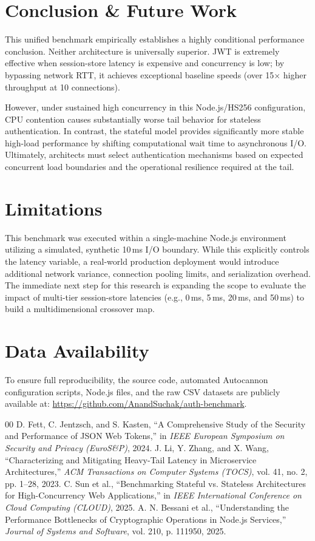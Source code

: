 \documentclass[conference]{IEEEtran}
\begin{document}
\section{Conclusion \& Future Work}
This unified benchmark empirically establishes a highly conditional performance conclusion. Neither architecture is universally superior. JWT is extremely effective when session-store latency is expensive and concurrency is low; by bypassing network RTT, it achieves exceptional baseline speeds (over 15$\times$ higher throughput at 10 connections).

However, under sustained high concurrency in this Node.js/HS256 configuration, CPU contention causes substantially worse tail behavior for stateless authentication. In contrast, the stateful model provides significantly more stable high-load performance by shifting computational wait time to asynchronous I/O. Ultimately, architects must select authentication mechanisms based on expected concurrent load boundaries and the operational resilience required at the tail.

\section{Limitations}
This benchmark was executed within a single-machine Node.js environment utilizing a simulated, synthetic 10\,ms I/O boundary. While this explicitly controls the latency variable, a real-world production deployment would introduce additional network variance, connection pooling limits, and serialization overhead. The immediate next step for this research is expanding the scope to evaluate the impact of multi-tier session-store latencies (e.g., 0\,ms, 5\,ms, 20\,ms, and 50\,ms) to build a multidimensional crossover map.

\section{Data Availability}
To ensure full reproducibility, the source code, automated Autocannon configuration scripts, Node.js files, and the raw CSV datasets are publicly available at: \url{https://github.com/AnandSuchak/auth-benchmark}.

\begin{thebibliography}{00}
 D. Fett, C. Jentzsch, and S. Kasten, ``A Comprehensive Study of the Security and Performance of JSON Web Tokens,'' in \textit{IEEE European Symposium on Security and Privacy (EuroS\&P)}, 2024.
 J. Li, Y. Zhang, and X. Wang, ``Characterizing and Mitigating Heavy-Tail Latency in Microservice Architectures,'' \textit{ACM Transactions on Computer Systems (TOCS)}, vol. 41, no. 2, pp. 1--28, 2023.
 C. Sun et al., ``Benchmarking Stateful vs. Stateless Architectures for High-Concurrency Web Applications,'' in \textit{IEEE International Conference on Cloud Computing (CLOUD)}, 2025.
 A. N. Bessani et al., ``Understanding the Performance Bottlenecks of Cryptographic Operations in Node.js Services,'' \textit{Journal of Systems and Software}, vol. 210, p. 111950, 2025.
\end{thebibliography}
\end{document}
